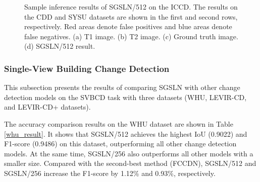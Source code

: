 \documentclass[journal]{IEEEtran}
\begin{document}
\begin{figure}[!ht] \centering
{}
\caption{Sample inference results of SGSLN/512 on the ICCD. The results on the CDD and SYSU datasets are shown in the first and second rows, respectively. Red areas denote false positives and blue areas denote false negatives. (a) T1 image. (b) T2 image. (c) Ground truth image. (d) SGSLN/512 result.}
\label{Fig:ic_result}
\end{figure}

\subsubsection{Single-View Building Change Detection}
\label{section:4.4.2}

This subsection presents the results of comparing SGSLN with other change detection models on the SVBCD task with three datasets (WHU, LEVIR-CD, and LEVIR-CD+ datasets).

The accuracy comparison results on the WHU dataset are shown in Table \ref{whu_result}. It shows that SGSLN/512 achieves the highest IoU (0.9022) and F1-score (0.9486) on this dataset, outperforming all other change detection models. At the same time, SGSLN/256 also outperforms all other models with a smaller size. Compared with the second-best method (FCCDN), SGSLN/512 and SGSLN/256 increase the F1-score by 1.12\% and 0.93\%, respectively.
\end{document}
